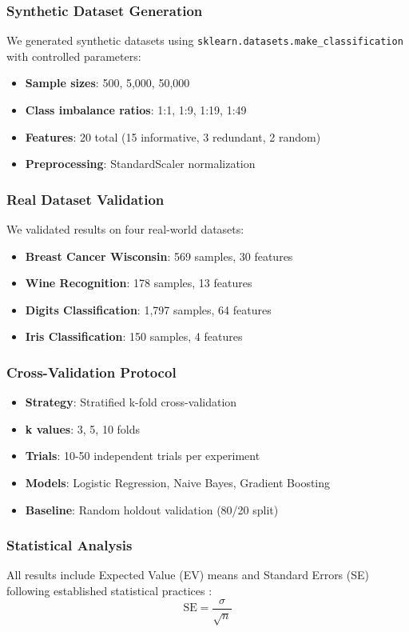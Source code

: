 \documentclass[11pt,twocolumn]{article}
\begin{document}
\subsubsection{Synthetic Dataset Generation}
We generated synthetic datasets using \texttt{sklearn.datasets.make\_classification} with controlled parameters:
\begin{itemize}
    \item \textbf{Sample sizes}: 500, 5,000, 50,000
    \item \textbf{Class imbalance ratios}: 1:1, 1:9, 1:19, 1:49
    \item \textbf{Features}: 20 total (15 informative, 3 redundant, 2 random)
    \item \textbf{Preprocessing}: StandardScaler normalization
\end{itemize}

\subsubsection{Real Dataset Validation}
We validated results on four real-world datasets:
\begin{itemize}
    \item \textbf{Breast Cancer Wisconsin}: 569 samples, 30 features
    \item \textbf{Wine Recognition}: 178 samples, 13 features
    \item \textbf{Digits Classification}: 1,797 samples, 64 features
    \item \textbf{Iris Classification}: 150 samples, 4 features
\end{itemize}

\subsubsection{Cross-Validation Protocol}
\begin{itemize}
    \item \textbf{Strategy}: Stratified k-fold cross-validation
    \item \textbf{k values}: 3, 5, 10 folds
    \item \textbf{Trials}: 10-50 independent trials per experiment
    \item \textbf{Models}: Logistic Regression, Naive Bayes, Gradient Boosting
    \item \textbf{Baseline}: Random holdout validation (80/20 split)
\end{itemize}

\subsubsection{Statistical Analysis}
All results include Expected Value (EV) means and Standard Errors (SE) following established statistical practices \cite{cohen1988statistical}:
\begin{equation}
\text{SE} = \frac{\sigma}{\sqrt{n}}
\end{equation}
\end{document}
